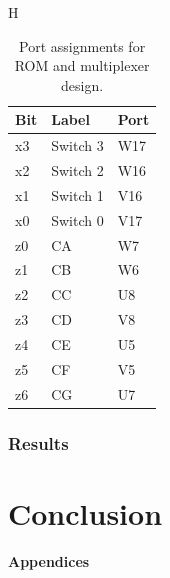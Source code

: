 \documentclass[11pt]{article}
\begin{document}
\begin{table}{H}
\begin{center}
\begin{tabular}{| l | l | l |}
	\hline
	Bit & Label & Port \\ \hline
	x3 & Switch 3 & W17 \\ \hline
	x2 & Switch 2 & W16 \\ \hline
	x1 & Switch 1 & V16 \\ \hline
	x0 & Switch 0 & V17 \\ \hline
	z0 & CA & W7 \\ \hline
	z1 & CB & W6 \\ \hline
	z2 & CC & U8 \\ \hline
	z3 & CD & V8 \\ \hline
	z4 & CE & U5 \\ \hline
	z5 & CF & V5 \\ \hline
	z6 & CG & U7 \\ \hline
\end{tabular}
\caption{\label{tab:romMuxPorts}Port assignments for ROM and multiplexer design.}
\end{center}
\end{table}

\subsubsection{Results}

\section{Conclusion}

\pagebreak

\textbf{Appendices}
\end{document}

